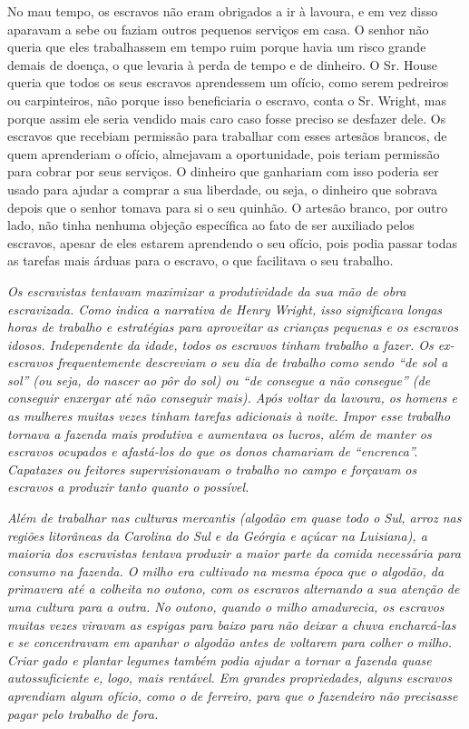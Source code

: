 No mau tempo, os escravos não eram obrigados a ir à lavoura, e em vez
disso aparavam a sebe ou faziam outros pequenos serviços em casa. O
senhor não queria que eles trabalhassem em tempo ruim porque havia um
risco grande demais de doença, o que levaria à perda de tempo e de
dinheiro. O Sr. House queria que todos os seus escravos aprendessem um
ofício, como serem pedreiros ou carpinteiros, não porque isso
beneficiaria o escravo, conta o Sr. Wright, mas porque assim ele seria
vendido mais caro caso fosse preciso se desfazer dele. Os escravos que
recebiam permissão para trabalhar com esses artesãos brancos, de quem
aprenderiam o ofício, almejavam a oportunidade, pois teriam permissão
para cobrar por seus serviços. O dinheiro que ganhariam com isso poderia
ser usado para ajudar a comprar a sua liberdade, ou seja, o dinheiro que
sobrava depois que o senhor tomava para si o seu quinhão. O artesão
branco, por outro lado, não tinha nenhuma objeção específica ao fato de
ser auxiliado pelos escravos, apesar de eles estarem aprendendo o seu
ofício, pois podia passar todas as tarefas mais árduas para o escravo, o
que facilitava o seu trabalho.

\emph{Os escravistas tentavam maximizar a produtividade da sua mão de
obra escravizada. Como indica a narrativa de Henry Wright, isso
significava longas horas de trabalho e estratégias para aproveitar as
crianças pequenas e os escravos idosos. Independente da idade, todos os
escravos tinham trabalho a fazer. Os ex-escravos frequentemente
descreviam o seu dia de trabalho como sendo ``de sol a sol'' (ou seja,
do nascer ao pôr do sol) ou ``de consegue a não consegue'' (de conseguir
enxergar até não conseguir mais). Após voltar da lavoura, os homens e as
mulheres muitas vezes tinham tarefas adicionais à noite. Impor esse
trabalho tornava a fazenda mais produtiva e aumentava os lucros, além de
manter os escravos ocupados e afastá-los do que os donos chamariam de
``encrenca''. Capatazes ou feitores supervisionavam o trabalho no campo
e forçavam os escravos a produzir tanto quanto o possível. }

\emph{Além de trabalhar nas culturas mercantis (algodão em quase todo o
Sul, arroz nas regiões litorâneas da Carolina do Sul e da Geórgia e
açúcar na Luisiana), a maioria dos escravistas tentava produzir a maior
parte da comida necessária para consumo na fazenda. O milho era
cultivado na mesma época que o algodão, da primavera até a colheita no
outono, com os escravos alternando a sua atenção de uma cultura para a
outra. No outono, quando o milho amadurecia, os escravos muitas vezes
viravam as espigas para baixo para não deixar a chuva encharcá-las e se
concentravam em apanhar o algodão antes de voltarem para colher o milho.
Criar gado e plantar legumes também podia ajudar a tornar a fazenda
quase autossuficiente e, logo, mais rentável. Em grandes propriedades,
alguns escravos aprendiam algum ofício, como o de ferreiro, para que o
fazendeiro não precisasse pagar pelo trabalho de fora.}

